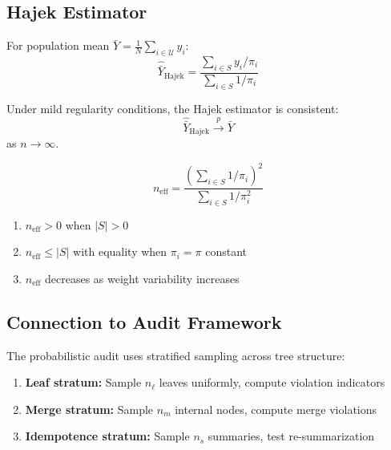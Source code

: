 \subsection{Hajek Estimator}

\begin{definition}
For population mean $\bar{Y} = \frac{1}{N}\sum_{i \in \mathcal{U}} y_i$:
\[
\hat{\bar{Y}}_{\text{Hajek}} = \frac{\sum_{i \in S} y_i / \pi_i}{\sum_{i \in S} 1 / \pi_i}
\]
\end{definition}

\begin{theorem}
Under mild regularity conditions, the Hajek estimator is consistent:
\[
\hat{\bar{Y}}_{\text{Hajek}} \xrightarrow{p} \bar{Y}
\]
as $n \to \infty$.
\end{theorem}

\begin{definition}
\[
n_{\text{eff}} = \frac{\left(\sum_{i \in S} 1/\pi_i\right)^2}{\sum_{i \in S} 1/\pi_i^2}
\]
\end{definition}

\begin{lemma}
\begin{enumerate}
    \item $n_{\text{eff}} > 0$ when $|S| > 0$
    \item $n_{\text{eff}} \le |S|$ with equality when $\pi_i = \pi$ constant
    \item $n_{\text{eff}}$ decreases as weight variability increases
\end{enumerate}
\end{lemma}

\subsection{Connection to Audit Framework}

The probabilistic audit uses stratified sampling across tree structure:

\begin{definition}
\begin{enumerate}
    \item \textbf{Leaf stratum:} Sample $n_\ell$ leaves uniformly, compute violation indicators
    \item \textbf{Merge stratum:} Sample $n_m$ internal nodes, compute merge violations
    \item \textbf{Idempotence stratum:} Sample $n_s$ summaries, test re-summarization
\end{enumerate}
\end{definition}

